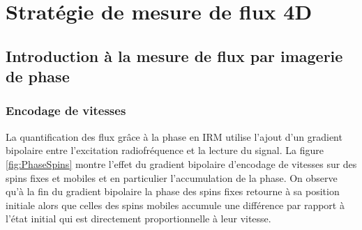 
\section{Stratégie de mesure de flux 4D}

\subsection{Introduction à la mesure de flux par imagerie de phase}

\subsubsection{Encodage de vitesses}

La quantification des flux grâce à la phase en IRM utilise l'ajout d'un gradient bipolaire entre l'excitation radiofréquence et la lecture du signal. La figure \ref{fig:PhaseSpins} montre l'effet du gradient bipolaire d'encodage de vitesses sur des spins fixes et mobiles et en particulier l'accumulation de la phase. On observe qu'à la fin du gradient bipolaire la phase des spins fixes retourne à sa position initiale alors que celles des spins mobiles accumule une différence par rapport à l'état initial qui est directement proportionnelle à leur vitesse.

